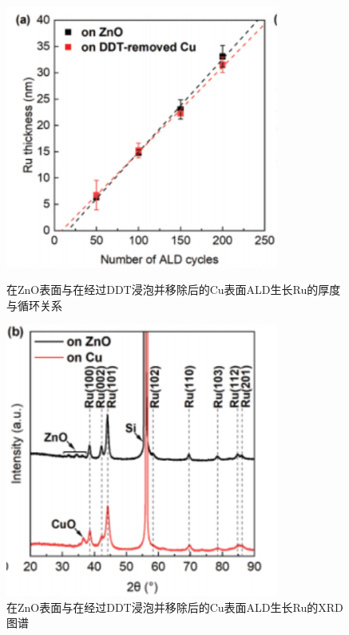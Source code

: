 \documentclass[UTF8,a4paper,12pt]{ctexart}%
\begin{document}
\begin{figure}[htb]
	\centering
	\begin{minipage}[t]{0.5\textwidth}
	\centering
	\includegraphics[width=0.8\textwidth]{19.jpg}
	\caption{在ZnO表面与在经过DDT浸泡并移除后的Cu表面ALD生长Ru的厚度与循环关系}
	\label{Fig:19}
	\end{minipage}
	\begin{minipage}[t]{0.45\textwidth}
	\centering
	\includegraphics[width=0.8\textwidth]{20.jpg}
	\caption{在ZnO表面与在经过DDT浸泡并移除后的Cu表面ALD生长Ru的XRD图谱}
	\label{Fig:20}
	\end{minipage}
\end{figure}
\end{document}
